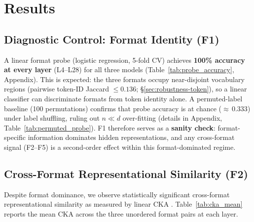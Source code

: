 
\section{Results}
\label{sec:results}

\subsection{Diagnostic Control: Format Identity (F1)}
\label{sec:f1}

A linear format probe (logistic regression, 5-fold CV) achieves \textbf{100\% accuracy at every layer} (L4--L28) for all three models (Table~\ref{tab:probe_accuracy}, Appendix).
This is expected: the three formats occupy near-disjoint vocabulary regions (pairwise token-ID Jaccard $\leq 0.136$; \S\ref{sec:robustness-token}), so a linear classifier can discriminate formats from token identity alone.
A permuted-label baseline (100 permutations) confirms that probe accuracy is at chance (${\approx}\,0.333$) under label shuffling, ruling out $n \ll d$ over-fitting (details in Appendix, Table~\ref{tab:permuted_probe}).
F1 therefore serves as a \textbf{sanity check}: format-specific information dominates hidden representations, and any cross-format signal (F2--F5) is a second-order effect within this format-dominated regime.

\subsection{Cross-Format Representational Similarity (F2)}
\label{sec:f2}

Despite format dominance, we observe statistically significant cross-format representational similarity as measured by linear CKA \cite{kornblith2019similarity}.
Table~\ref{tab:cka_mean} reports the mean CKA across the three unordered format pairs at each layer.

